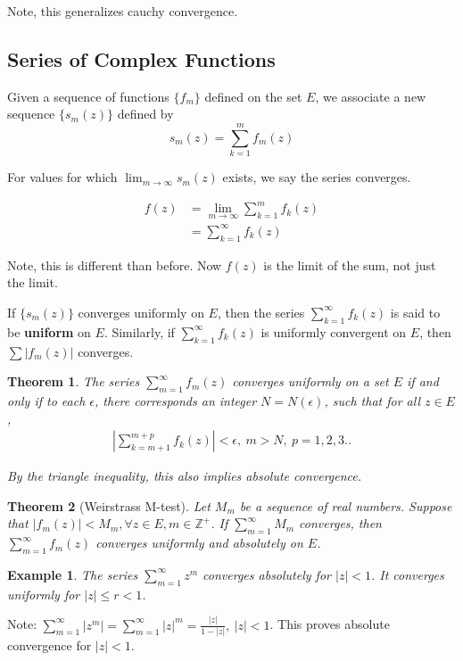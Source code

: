\documentclass{article}
\newtheorem{theorem}{Theorem}[section]
\newtheorem{ex}{Example}
\theoremstyle{definition}
\begin{document}
Note, this generalizes cauchy convergence. 



\subsection{Series of Complex Functions}
Given a sequence of functions $\{f_m\}$ defined on the set $E$, we associate a new sequence $\{s_m(z)\}$ defined by 
$$s_m(z) = \sum_{k=1}^m f_m(z)$$

For values for which  $\lim_{m \to \infty }s_m(z)$ exists, we say the series converges. 

\begin{align*}
f(z) &= \lim_{m \to \infty } \sum_{k=1}^m f_k(z) \\ 
& = \sum_{k=1}^\infty f_k(z)
\end{align*}

Note, this is different than before. Now $f(z)$ is the limit of the sum, not just the limit.

If $\{s_m(z)\}$ converges uniformly on $E$, then the series $\sum_{k=1}^\infty f_k(z)$ is said to be \textbf{uniform} on $E$. Similarly, if $\sum_{k=1}^\infty f_k(z)$ is uniformly convergent on $E$, then
$\sum\left|f_m(z)\right|$ converges. 

\begin{theorem}
The series $\sum_{m=1}^\infty f_m(z)$ converges uniformly on a set $E$ if and only if to each $\epsilon$, there corresponds an integer $N = N(\epsilon)$, such that for all $z \in E$, 
\begin{align*}
\left|\sum_{k=m+1}^{m+p}f_k(z) \right| < \epsilon,\ m>N,\ p = 1,2,3..
\end{align*}


By the triangle inequality, this also implies absolute convergence. 
\end{theorem}

\begin{theorem}[Weirstrass M-test]
Let $M_m$ be a sequence of real numbers. Suppose that $|f_m(z)| < M_m, \forall z \in E, m\in \mathbb{Z}^+$.  If $\sum_{m=1}^\infty M_m$ converges, then $\sum_{m=1}^\infty f_m(z)$ converges uniformly and absolutely on $E$. 
\end{theorem}
\begin{ex}
The series $\sum_{m=1}^\infty z^m $ converges absolutely for $|z|<1$. It converges uniformly for $|z|\leq r < 1$. 
\end{ex}

Note: $\sum_{m=1}^\infty |z^m| = \sum_{m=1}^\infty |z|^m = \frac{|z|}{1-|z|},\ |z|<1$. This proves absolute convergence for $|z|<1$. 
\end{document}
